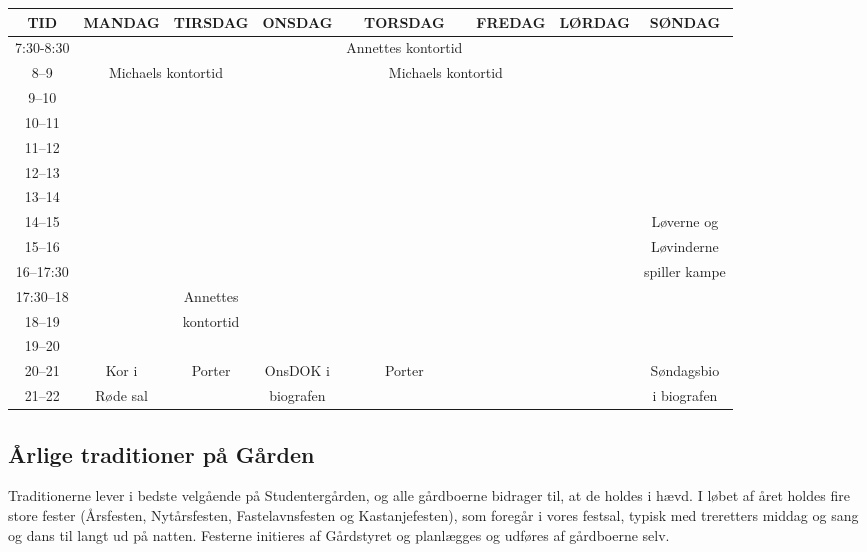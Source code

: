 \documentclass[11pt,article,twoside,openany,danish,extrafontsizes]{memoir} %
\begin{document}
\begin{landscape}
\begin{table}[p]
\begin{center}
\begin{tabular}{|>{\sffamily}c|c|c|c|c|c|c|c|}
\hline
\textsf{TID}		&	\textsf{MANDAG}	& \textsf{TIRSDAG}	& \textsf{ONSDAG}	& \textsf{TORSDAG}	& \textsf{FREDAG}	& \textsf{LØRDAG}	& \textsf{SØNDAG} \\ \hline
\rowcolor{SG-dark!10} 7:30-8:30 & & & & Annettes kontortid & & & \\ \hline
\rowcolor{SG-dark!10} 8--9	& \multicolumn{2}{|c|}{Michaels kontortid}	& & \multicolumn{2}{|c|}{Michaels kontortid} & & \\ \hline
\rowcolor{SG-dark!05} 9--10	& & & & & & & \\ \hline
\rowcolor{SG-dark!10} 10--11	& & & & & & & \\ \hline
\rowcolor{SG-dark!15} 11--12	& & & & & & & \\ \hline
\rowcolor{SG-dark!20} 12--13	& & & & & & & \\ \hline
\rowcolor{SG-dark!25} 13--14	& & & & & & & \\ \hline
\rowcolor{SG-dark!30} 14--15	& & & & & & & Løverne og \\ \cline{1-7}
\rowcolor{SG-dark!35} 15--16	& & & & & & & Løvinderne \\ \cline{1-7}
\rowcolor{SG-dark!40} 16--17:30	& & & & & & & spiller kampe \\ \hline
\rowcolor{SG-dark!45} 17:30--18	& & Annettes & & & & & \\ \cline{1-2} \cline{4-4} \cline{6-8}
\rowcolor{SG-dark!50} 18--19	& & kontortid & & & & & \\ \hline
\rowcolor{SG-dark!55} 19--20	& & & & & & & \\ \hline
\rowcolor{SG-dark!60} 20--21	& Kor i & Porter & OnsDOK i & Porter & & & Søndagsbio \\ \cline{1-1} \cline{6-8}
\rowcolor{SG-dark!65} 21--22	& Røde sal & & biografen & & & & i biografen \\ \hline
\end{tabular}
\end{center}
\end{table}
\end{landscape}


\subsection{Årlige traditioner på Gården}
Traditionerne lever i bedste velgående på Studentergården, og alle gårdboerne bidrager til, at de holdes i hævd. I løbet af året holdes fire store fester (Årsfesten, Nytårsfesten, Fastelavnsfesten og Kastanjefesten), som foregår i vores festsal, typisk med treretters middag og sang og dans til langt ud på natten. Festerne initieres af Gårdstyret og planlægges og udføres af gårdboerne selv.
\end{document}
